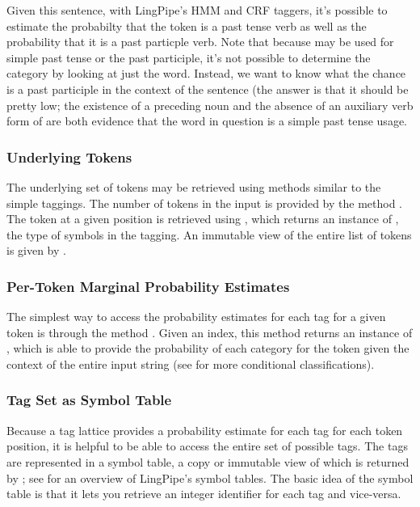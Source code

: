 Given this sentence, with LingPipe's HMM and CRF taggers, it's
possible to estimate the probabilty that the token
 is a past tense verb as well as the probability
that it is a past particple verb.  Note that because
 may be used for simple past tense or the past
participle, it's not possible to determine the category by looking at
just the word.  Instead, we want to know what the chance
 is a past participle in the context of the
sentence  (the answer is that it should
be pretty low; the existence of a preceding noun and the absence of an
auxiliary verb form of  are both evidence that the
word in question is a simple past tense usage. 

\subsubsection{Underlying Tokens}

The underlying set of tokens may be retrieved using methods similar to
the simple taggings.  The number of tokens in the input is provided by
the method . The token at a given position is
retrieved using , which returns an instance of
, the type of symbols in the tagging.  An immutable view of
the entire list of tokens is given by .

\subsubsection{Per-Token Marginal Probability Estimates}

The simplest way to access the probability estimates for each tag for
a given token is through the method .
Given an index, this method returns an instance of
, which is able to provide
the probability of each category for the token given the context
of the entire input string (see 
for more conditional classifications).

\subsubsection{Tag Set as Symbol Table}

Because a tag lattice provides a probability estimate for each tag for
each token position, it is helpful to be able to access the entire set
of possible tags.  The tags are represented in a symbol table, a copy
or immutable view of which is returned by ; see
 for an overview of LingPipe's symbol tables.
The basic idea of the symbol table is that it lets you retrieve an
integer identifier for each tag and vice-versa.

